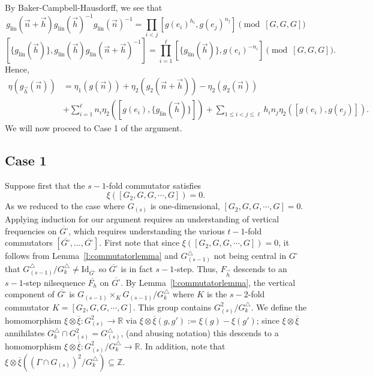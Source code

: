 \documentclass[11pt, a4paper]{amsart}
\theoremstyle{plain}
\theoremstyle{plain}
\theoremstyle{definition}
\theoremstyle{remark}
\numberwithin{equation}{section}
\numberwithin{lemma}{section}
\numberwithin{proposition}{section}
\numberwithin{corollary}{section}
\numberwithin{definition}{section}
\numberwithin{claim}{section}
\begin{document}
By Baker-Campbell-Hausdorff, we see that
$$g_{\mathrm{lin}}(\vec{n} + \vec{h})g_{\mathrm{lin}}(\vec{h})^{-1}g_{\mathrm{lin}}(\vec{n})^{-1} = \prod_{i < j} [g(e_i)^{h_i}, g(e_j)^{n_j}] \pmod{[G, G, G]}$$
$$[\{g_{\mathrm{lin}}(\vec{h})\}, g_{\mathrm{lin}}(\vec{h})g_{\mathrm{lin}}(\vec{n} + \vec{h})^{-1}] = \prod_{i = 1}^\ell [\{g_{\mathrm{lin}}(\vec{h})\}, g(e_i)^{-n_i}] \pmod{[G, G,G]}.$$
Hence,
\begin{align*}
\eta(g_{\vec{h}}(\vec{n})) &= \eta_1(g(\vec{n})) + \eta_2(g_2(\vec{n} + \vec{h})) - \eta_2(g_2(\vec{n})) \\
&+\sum_{i = 1}^\ell n_i\eta_2([g(e_i), \{g_{\mathrm{lin}}(\vec{h})\}]) + \sum_{1 \le i< j \le \ell} h_i n_j\eta_2([g(e_i), g(e_j)]).
\end{align*}
We will now proceed to Case 1 of the argument.
\subsection{Case 1}
Suppose first that the $s - 1$-fold commutator satisfies
$$\xi([G_2, G, G, \cdots, G]) = 0.$$
As we reduced to the case where $G_{(s)}$ is one-dimensional, $[G_2, G, G, \cdots, G] = 0$. Applying induction for our argument requires an understanding of vertical frequencies on $\overline{G^\square}$, which requires understanding the various $t - 1$-fold commutators $[\overline{G^\square}, \dots, \overline{G^{\square}}]$. First note that since $\xi([G_2, G, G, \cdots, G]) = 0$, it follows from Lemma~\ref{l:commutatorlemma} and $G_{(s - 1)}^\triangle$ not being central in $G^\square$ that $G_{(s - 1)}^\triangle/G_k^\triangle \neq \mathrm{Id}_{\overline{G^\square}}$ so $\overline{G^\square}$ is in fact $s - 1$-step. Thus, $F_{\vec{h}}$ descends to an $s - 1$-step nilsequence $\overline{F_h}$ on $\overline{G^\square}$. By Lemma~\ref{l:commutatorlemma}, the vertical component of $\overline{G^\square}$ is $G_{(s - 1)} \times_{K} G_{(s - 1)}/G_{k}^\triangle$
where $K$ is the $s - 2$-fold commutator $K = [G_2, G, G, \cdots, G]$. This group contains $G_{(s)}^2/G_k^\triangle$. We define the homomorphism $\xi \otimes \overline{\xi} \colon G_{(s)}^2 \to \mathbb{R}$ via $\xi \otimes \overline{\xi}(g, g') := \xi(g) - \xi(g')$; since $\xi \otimes \overline{\xi}$ annihilates $G_k^\triangle \cap G_{(s)}^2 = G_{(s)}^\triangle$, (and abusing notation) this descends to a homomorphism $\xi \otimes \overline{\xi} \colon G_{(s)}^2/G_k^\triangle \to \mathbb{R}$. In addition, note that $\xi \otimes\overline{\xi}((\Gamma \cap G_{(s)})^2/G_k^\triangle) \subseteq \mathbb{Z}$. \\\\
\end{document}
